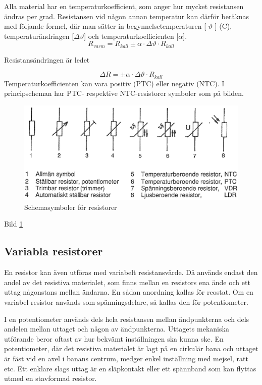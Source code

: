Alla material har en temperaturkoefficient, som anger hur mycket resistansen
ändras per grad. Resistansen vid någon annan temperatur kan därför beräknas med
följande formel, där man sätter in begynnelsetemperaturen [ \(\vartheta\) ]
(\degree C), temperaturändringen [\(\Delta \vartheta\)] och
temperaturkoefficienten [\(\alpha\)].
\[R_{varm} = R_{kall} \pm \alpha \cdot \Delta \vartheta \cdot R_{kall}
\]

Resistansändringen är ledet

\[\Delta R = \pm \alpha \cdot \Delta \vartheta \cdot R_{kall}
\]
Temperaturkoefficienten kan vara positiv (PTC) eller negativ (NTC).
I principscheman har PTC- respektive NTC-resistorer symboler som på bilden.

\begin{figure}
\includegraphics[width=\textwidth]{images/cropped_pdfs/bild_2_2-01.pdf}
\caption{Schemasymboler för resistorer}
\label{fig:BildII2-1}
\end{figure}

Bild \ref{fig:BildII2-1}

\subsection{Variabla resistorer}

En resistor kan även utföras med variabelt resistansvärde. Då används endast
den andel av det resistiva materialet, som finns mellan en resistors ena ände
och ett uttag någonstans mellan ändarna. En sådan anordning kallas för reostat.
Om en variabel resistor används som spänningsdelare, så kallas den för
potentiometer.

I en potentiometer används dels hela resistansen mellan ändpunkterna och dels
andelen mellan uttaget och någon av ändpunkterna. Uttagets mekaniska utförande
beror oftast av hur bekvämt inställningen ska kunna ske. En potentiometer,
där det resistiva materialet är lagt på en cirkulär bana och uttaget är fäst
vid en axel i banans centrum, medger enkel inställning med mejsel, ratt etc.
Ett enklare slags uttag är en släpkontakt eller ett spännband som kan flyttas
utmed en stavformad resistor.

